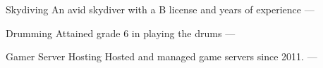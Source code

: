 

\begin{cvhonors}

  \cvhonor
    {Skydiving} %
    {An avid skydiver with a B license and years of experience} %
    {} %
    {---} %

  \cvhonor
    {Drumming} %
    {Attained grade 6 in playing the drums} %
    {} %
    {---} %

  \cvhonor
    {Gamer Server Hosting} %
    {Hosted and managed game servers since 2011.} %
    {} %
    {---} %

\end{cvhonors}
